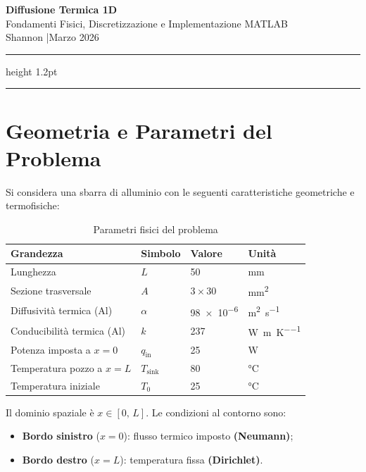 \documentclass[11pt, a4paper]{article}
\begin{document}
\begin{center}
  {\LARGE\bfseries\color{myblue} Diffusione Termica 1D}\\[6pt]
  {\large Fondamenti Fisici, Discretizzazione e Implementazione MATLAB}\\[8pt]
  {\normalsize Shannon \quad|\quad Marzo 2026}
\end{center}

\vspace{0.5em}
\hrule height 1.2pt
\vspace{1.5em}

\tableofcontents

\vspace{1.5em}
\hrule
\newpage

\section{Geometria e Parametri del Problema}

Si considera una sbarra di alluminio con le seguenti caratteristiche geometriche e termofisiche:

\begin{table}[h!]
\centering
\caption{Parametri fisici del problema}
\begin{tabular}{llll}
\toprule
\textbf{Grandezza} & \textbf{Simbolo} & \textbf{Valore} & \textbf{Unità} \\
\midrule
Lunghezza                    & $L$       & \num{50}    & \si{\milli\meter} \\
Sezione trasversale          & $A$       & $\num{3} \times \num{30}$  & \si{\milli\meter\squared} \\
Diffusività termica (Al)     & $\alpha$  & \num{98e-6} & \si{\meter\squared\per\second} \\
Conducibilità termica (Al)   & $k$       & \num{237}   & \si{\watt\per\meter\per\kelvin} \\
Potenza imposta a $x=0$      & $q_\text{in}$ & \num{25} & \si{\watt} \\
Temperatura pozzo a $x=L$    & $T_\text{sink}$ & \num{80} & \si{\celsius} \\
Temperatura iniziale         & $T_0$     & \num{25}   & \si{\celsius} \\
\bottomrule
\end{tabular}
\end{table}

Il dominio spaziale è $x \in [0,\, L]$. Le condizioni al contorno sono:
\begin{itemize}
  \item \textbf{Bordo sinistro} ($x = 0$): flusso termico imposto \textbf{(Neumann)};
  \item \textbf{Bordo destro} ($x = L$): temperatura fissa \textbf{(Dirichlet)}.
\end{itemize}
\end{document}
